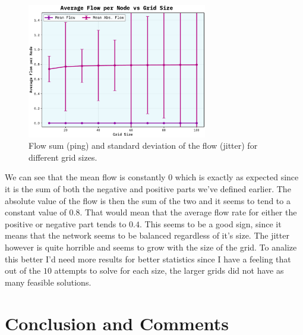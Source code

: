 \documentclass[10pt, titlepage, a4paper]{article}
\begin{document}
\begin{figure}[H]
    \centering
    \includegraphics[width=0.7\textwidth]{../Images/flow-sum.pdf}
    \caption{Flow sum (ping) and standard deviation of the flow (jitter) for different grid sizes.}
    \label{fig:ping-jitter}
\end{figure}

We can see that the mean flow is constantly $0$ which is exactly as expected since it is the sum of both the 
negative and positive parts we've defined earlier. The absolute value of the flow is then the sum of the two and 
it seems to tend to a constant value of $0.8$. That would mean that the average flow rate for either the positive or 
negative part tends to $0.4$. This seems to be a good sign, since it means that the network seems to be balanced regardless of 
it's size. The jitter however is quite horrible and seems to grow with the size of the grid. To analize this better I'd need 
more results for better statistics since I have a feeling that out of the $10$ attempts to solve for each size, the larger grids 
did not have as many feasible solutions. \\

\section{Conclusion and Comments}


\newpage



\end{document}
